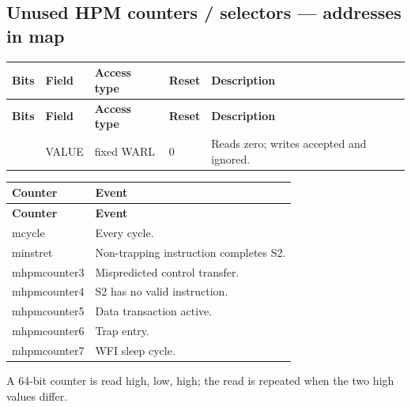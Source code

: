 \documentclass[11pt]{article}
\begin{document}
\subsection*{Unused HPM counters / selectors — addresses in map}
{\small
\begin{longtable}{@{}L{0.1200\dimexpr\linewidth-48pt\relax}L{0.1800\dimexpr\linewidth-48pt\relax}L{0.1200\dimexpr\linewidth-48pt\relax}L{0.1200\dimexpr\linewidth-48pt\relax}L{0.4600\dimexpr\linewidth-48pt\relax}@{}}
\toprule
\textbf{Bits} & \textbf{Field} & \textbf{Access type} & \textbf{Reset} & \textbf{Description} \\ \midrule
\endfirsthead
\toprule
\textbf{Bits} & \textbf{Field} & \textbf{Access type} & \textbf{Reset} & \textbf{Description} \\ \midrule
\endhead
[31:0] & VALUE & fixed WARL & 0 & Reads zero; writes accepted and ignored. \\*
\bottomrule\end{longtable}}
{\small
\begin{longtable}{@{}L{0.3000\dimexpr\linewidth-12pt\relax}L{0.7000\dimexpr\linewidth-12pt\relax}@{}}
\toprule
\textbf{Counter} & \textbf{Event} \\ \midrule
\endfirsthead
\toprule
\textbf{Counter} & \textbf{Event} \\ \midrule
\endhead
mcycle & Every cycle. \\ \addlinespace[3pt]
minstret & Non-trapping instruction completes S2. \\ \addlinespace[3pt]
mhpmcounter3 & Mispredicted control transfer. \\ \addlinespace[3pt]
mhpmcounter4 & S2 has no valid instruction. \\ \addlinespace[3pt]
mhpmcounter5 & Data transaction active. \\ \addlinespace[3pt]
mhpmcounter6 & Trap entry. \\ \addlinespace[3pt]
mhpmcounter7 & WFI sleep cycle. \\*
\bottomrule\end{longtable}}
\noindent A 64-bit counter is read high, low, high; the read is repeated when the two high values differ.\par\medskip

\end{document}
